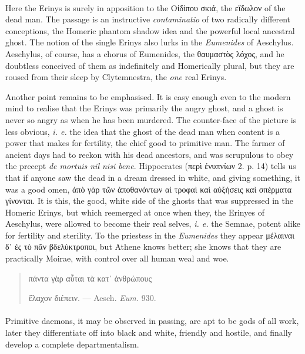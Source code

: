 \documentclass[a4paper, 11pt, oneside, polutonikogreek, english]{article}
\begin{document}
\paragraph{}
Here the Erinys is surely in apposition to the Οἰδίπου σκιά, the εἴδωλον of the dead man. The passage is an instructive \emph{contaminatio} of two radically different conceptions, the Homeric phantom shadow idea and the powerful local ancestral ghost. The notion of the single Erinys also lurks in the \emph{Eumenides} of Aeschylus. Aeschylus, of course, has a chorus of Eumenides, the θαυμαστὸς λόχος, and he doubtless conceived of them as indefinitely and Homerically plural, but they are roused from their sleep by Clytemnestra, the \emph{one} real Erinys.

Another point remains to be emphasised. It is easy enough even to the modern mind to realise that the Erinys was primarily the angry ghost, and a ghost is never so angry as when he has been murdered. The counter-face of the picture is less obvious, \emph{i. e.} the idea that the ghost of the dead man when content is a power that makes for fertility, the chief good to primitive man. The farmer of ancient days had to reckon with his dead ancestors, and was scrupulous to obey the precept \emph{de mortuis nil nisi bene}. Hippocrates (περὶ ἐνυπνίων 2. p. 14) tells us that if anyone saw the dead in a dream dressed in white, and giving something, it was a good omen, ἀπὸ γὰρ τῶν ἀποθανόντων αἱ τροφαὶ καὶ αὐξήσεις καὶ σπέρματα γίνονται. It is this, the good, white side of the ghosts that was suppressed in the Homeric Erinys, but which reemerged at once when they, the Erinyes of Aeschylus, were allowed to become their real selves, \emph{i. e.} the Semnae, potent alike for fertility and sterility. To the priestess in the \emph{Eumenides} they appear μέλαιναι δ᾽ ἐς τὸ πᾶν βδελύκτροποι, but Athene knows better; she knows that they are practically Moirae, with control over all human weal and woe.
\begin{quotation}
πάντα γὰρ αὗται τὰ κατ᾽ ἀνθρώπους

ἔλαχον διέπειν. --- Aesch. \emph{Eum.} 930.
\end{quotation}
\paragraph{}
Primitive daemons, it may be observed in passing, are apt to be gods of all work, later they differentiate off into black and white, friendly and hostile, and finally develop a complete departmentalism.
\end{document}
